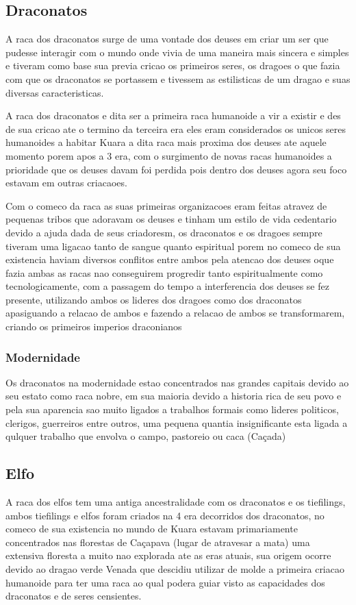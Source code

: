 \documentclass{book}
\begin{document}
\subsection{Draconatos}
A raca dos draconatos surge de uma vontade dos deuses em criar um ser que pudesse interagir 
com o mundo onde vivia de uma maneira mais sincera e simples e tiveram como base sua previa 
cricao os primeiros seres, os dragoes o que fazia com que os draconatos se portassem e tivessem as
estilisticas de um dragao e suas diversas caracteristicas.

A raca dos draconatos e dita ser a primeira raca humanoide a vir a existir e des de sua cricao 
ate o termino da terceira era eles eram considerados os unicos seres humanoides a habitar Kuara 
a dita raca mais proxima dos deuses ate aquele momento porem apos  a 3 era, com o surgimento de 
novas racas humanoides a prioridade que os deuses davam 
foi perdida pois dentro dos deuses agora seu foco estavam em outras criacaoes.

Com o comeco da raca as suas primeiras organizacoes eram feitas atravez de pequenas tribos que 
adoravam os deuses e tinham um estilo de vida cedentario devido a ajuda dada de seus criadoresm,
os draconatos e os dragoes sempre tiveram uma ligacao tanto de sangue quanto espiritual 
porem no comeco de sua existencia haviam diversos conflitos entre ambos pela atencao dos deuses
oque fazia ambas as racas nao conseguirem progredir tanto espiritualmente como tecnologicamente, 
com a passagem do tempo a interferencia dos deuses se fez presente, utilizando ambos os lideres 
dos dragoes como dos draconatos apasiguando a relacao de ambos e fazendo a relacao de ambos se 
transformarem, criando os primeiros imperios draconianos 

\subsubsection*{Modernidade}
Os draconatos na modernidade estao concentrados nas grandes capitais devido ao seu estato como 
raca nobre, em sua maioria devido a historia rica de seu povo e pela sua aparencia sao muito 
ligados a trabalhos formais como lideres politicos, clerigos, guerreiros entre outros, uma 
pequena quantia insignificante esta ligada a qulquer trabalho que envolva o campo, pastoreio ou
caca (Caçada)

\subsection{Elfo}
A raca dos elfos tem uma antiga ancestralidade com os draconatos e os tiefilings, ambos tiefilings 
e elfos foram criados na 4 era decorridos dos draconatos, no comeco de sua existencia no mundo 
de Kuara estavam primariamente concentrados nas florestas de Caçapava (lugar de atravesar a mata)
uma extensiva floresta a muito nao explorada ate as eras atuais, sua origem ocorre devido ao 
dragao verde Venada que descidiu utilizar de molde a primeira criacao humanoide para ter uma 
raca ao qual podera guiar visto as capacidades dos draconatos e de seres censientes. 
\end{document}

